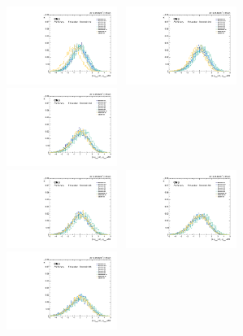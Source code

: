 \begin{figure}[p]
  \centering
  \includegraphics[width=0.32\textwidth]{Fig/BiasStudy/Pull/ZJpsiG_Cat2/pull_fitfunc0_leastbias}~
  \includegraphics[width=0.32\textwidth]{Fig/BiasStudy/Pull/ZJpsiG_Cat2/pull_fitfunc1_leastbias}~
  \includegraphics[width=0.32\textwidth]{Fig/BiasStudy/Pull/ZJpsiG_Cat2/pull_fitfunc2_leastbias}\\
  \includegraphics[width=0.32\textwidth]{Fig/BiasStudy/Pull/ZJpsiG_Cat2/pull_fitfunc3_leastbias}~
  \includegraphics[width=0.32\textwidth]{Fig/BiasStudy/Pull/ZJpsiG_Cat2/pull_fitfunc4_leastbias}~
  \includegraphics[width=0.32\textwidth]{Fig/BiasStudy/Pull/ZJpsiG_Cat2/pull_fitfunc5_leastbias}\\

\end{figure}
